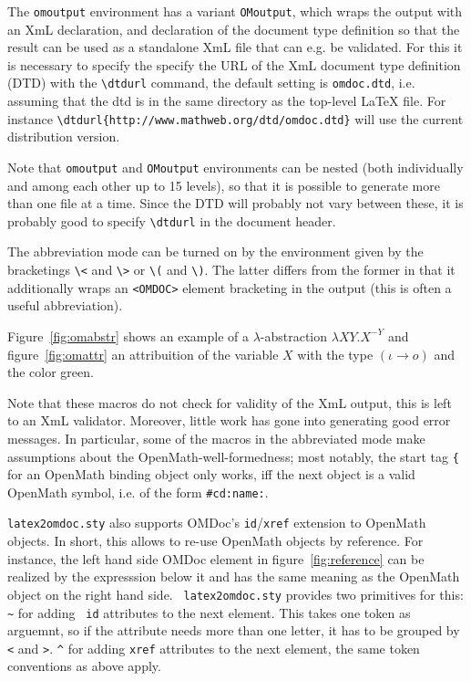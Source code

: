 \documentclass{article}
\def\xml{{\sc XmL}}
\def\openmath{{\sc OpenMath}}
\def\omdocname{{\sc OMDoc}}
\begin{document}
The {\tt omoutput} environment has a variant {\tt OMoutput}, which wraps the
output with an {\xml} declaration, and declaration of the document type definition
so that the result can be used as a standalone {\xml} file that can e.g. be
validated. For this it is necessary to specify the specify the URL of the {\xml}
document type definition (DTD) with the {\verb+\dtdurl+} command, the default
setting is {\tt omdoc.dtd}, i.e. assuming that the dtd is in the same directory as
the top-level {\LaTeX} file. For instance
{\verb+\dtdurl{http://www.mathweb.org/dtd/omdoc.dtd}+} will use the current
distribution version.

Note that {\tt omoutput} and {\tt OMoutput} environments can be nested (both
individually and among each other up to 15 levels), so that it is possible to
generate more than one file at a time. Since the DTD will probably not vary
between these, it is probably good to specify {\verb+\dtdurl+} in the document
header.

The abbreviation mode can be turned on by the environment given by the bracketings
{\verb+\<+} and {\verb+\>+} or {\verb+\(+} and {\verb+\)+}. The latter differs
from the former in that it additionally wraps an {\verb+<OMDOC>+} element
bracketing in the output (this is often a useful abbreviation).

Figure~\ref{fig:omabstr} shows an example of a $\lambda$-abstraction
$\lambda X Y.X^{-Y}$ and figure~\ref{fig:omattr} an attribuition of the variable $X$
with the type $(\iota\rightarrow o)$ and the color green.


Note that these macros do not check for validity of the {\xml} output, this is
left to an {\xml} validator. Moreover, little work has gone into generating good
error messages. In particular, some of the macros in the abbreviated mode make
assumptions about the {\openmath}-well-formedness; most notably, the start tag
{\verb+{+} for an {\openmath} binding object only works, iff the next object is a
valid {\openmath} symbol, i.e. of the form {\verb+#cd:name:+}.

{\tt latex2omdoc.sty} also supports {\omdocname}'s {\tt id}/{\tt xref} extension
to {\openmath} objects. In short, this allows to re-use {\openmath} objects by
reference. For instance, the left hand side {\omdocname} element in
figure~\ref{fig:reference} can be realized by the expresssion below it and has the
same meaning as the {\openmath} object on the right hand side. {\tt
  latex2omdoc.sty} provides two primitives for this: {\verb+~+} for adding {\tt
  id} attributes to the next element. This takes one token as arguemnt, so if the
attribute needs more than one letter, it has to be grouped by {\tt <} and {\tt >}.
{\verb+^+} for adding {\tt xref} attributes to the next element, the same token
conventions as above apply.
\end{document}
